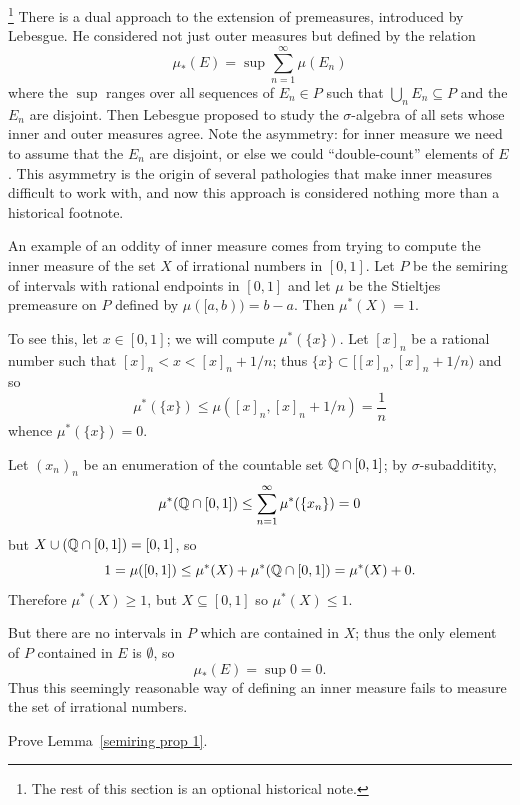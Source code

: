 \begin{subsec}\footnote{The rest of this section is an optional historical note.}
There is a dual approach to the extension of premeasures, introduced by Lebesgue.
He considered not just outer measures but  defined by the relation
\[\mu_{*}(E) = \sup \sum_{n=1}^{\infty} \mu(E_{n})\]
where the $\sup$ ranges over all sequences of $E_{n} \in P$ such that $\bigcup_{n} E_{n} \subseteq P$ and the $E_{n}$ are disjoint.
Then Lebesgue proposed to study the $\sigma$-algebra of all sets whose inner and outer measures agree.
Note the asymmetry: for inner measure we need to assume that the $E_{n}$ are disjoint, or else we could ``double-count'' elements of $E$.
This asymmetry is the origin of several pathologies that make inner measures difficult to work with, and now this approach is considered nothing more than a historical footnote.
\end{subsec}

\begin{example}
An example of an oddity of inner measure comes from trying to compute the inner measure of the set $X$ of irrational numbers in $[0, 1]$.
Let $P$ be the semiring of intervals with rational endpoints in $[0, 1]$ and let $\mu$ be the Stieltjes premeasure on $P$ defined by $\mu([a, b)) = b - a$.
Then $\mu^{*}(X) = 1$.

To see this, let $x \in [0, 1]$; we will compute $\mu^{*}(\{x\})$. Let ${[x]}_{n}$ be a rational number such that ${[x]}_{n} < x < {[x]}_{n} + 1/n$; thus $\{x\} \subset [{[x]}_{n}, {[x]}_{n} + 1/n)$ and so
\[\mu^{*}(\{x\}) \leq \mu({[x]}_{n}, {[x]}_{n} + 1/n) = \frac{1}{n}\]
whence $\mu^{*}(\{x\}) = 0$.

Let ${(x_{n})}_{n}$ be an enumeration of the countable set $\mathbb{Q} \cap [0, 1]$; by $\sigma$-subadditity,
\[\mu^{*}(\mathbb{Q} \cap [0, 1]) \leq \sum_{n=1}^{\infty} \mu^{*}(\{x_{n}\}) = 0\]
but $X \cup (\mathbb{Q} \cap [0, 1]) = [0, 1]$, so
\[1 = \mu([0, 1]) \leq \mu^{*}(X) + \mu^{*}(\mathbb{Q} \cap [0, 1]) = \mu^{*}(X) + 0.\]
Therefore $\mu^{*}(X) \geq 1$, but $X \subseteq [0, 1]$ so $\mu^{*}(X) \leq 1$.

But there are no intervals in $P$ which are contained in $X$; thus the only element of $P$ contained in $E$ is $\emptyset$, so
\[\mu_{*}(E) = \sup 0 = 0.\]
Thus this seemingly reasonable way of defining an inner measure fails to measure the set of irrational numbers.
\end{example}

\begin{exercise}\label{semiring exercise}
Prove Lemma~\ref{semiring prop 1}.
\end{exercise}


